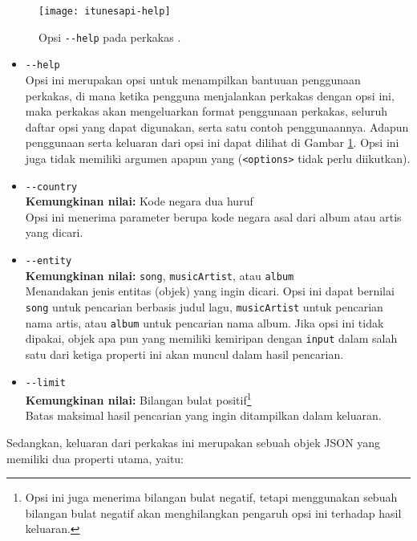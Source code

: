 \begin{figure}[h]
    \centering
    \texttt{[image: itunesapi-help]}
    \caption[Opsi bantuan penggunaan pada perkakas \itunesapi]{Opsi \texttt{-{}-help} pada perkakas \itunesapi.}
    \label{fig:similarapps-itunesapi-help}
\end{figure}

\begin{itemize}
	\item \verb|--help|\\
	Opsi ini merupakan opsi untuk menampilkan bantuuan penggunaan perkakas, di mana ketika pengguna menjalankan perkakas dengan opsi ini, maka perkakas akan mengeluarkan format penggunaan perkakas, seluruh daftar opsi yang dapat digunakan, serta satu contoh penggunaannya. Adapun penggunaan serta keluaran dari opsi ini dapat dilihat di Gambar \ref{fig:similarapps-itunesapi-help}. Opsi ini juga tidak memiliki argumen apapun yang  (\verb|<options>| tidak perlu diikutkan).
	\item \verb|--country|\\
	\textbf{Kemungkinan nilai:} Kode negara dua huruf\\
	Opsi ini menerima parameter berupa kode negara asal dari album atau artis yang dicari.
	\newpage\vspace*{-1.75em} %
	\item \verb|--entity|\\
	\textbf{Kemungkinan nilai:} \verb|song|, \verb|musicArtist|, atau \verb|album|\\
	Menandakan jenis entitas (objek) yang ingin dicari. Opsi ini dapat bernilai \verb|song| untuk pencarian berbasis judul lagu, \verb|musicArtist| untuk pencarian nama artis, atau \verb|album| untuk pencarian nama album. Jika opsi ini tidak dipakai, objek apa pun yang memiliki kemiripan dengan \verb|input| dalam salah satu dari ketiga properti ini akan muncul dalam hasil pencarian.
	\item \verb|--limit|\\
	\textbf{Kemungkinan nilai:} Bilangan bulat positif\footnote{Opsi ini juga menerima bilangan bulat negatif, tetapi menggunakan sebuah bilangan bulat negatif akan menghilangkan pengaruh opsi ini terhadap hasil keluaran.}\\
	Batas maksimal hasil pencarian yang ingin ditampilkan dalam keluaran.
\end{itemize}
\vspace{0.75\baselineskip} %
\noindent
Sedangkan, keluaran dari perkakas ini merupakan sebuah objek JSON yang memiliki dua properti utama, yaitu:

